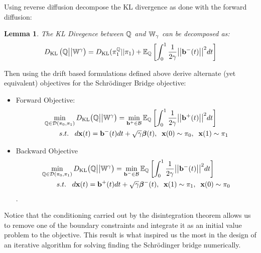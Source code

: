 \documentclass[a4paper,12pt,twoside,openright]{report}
\newtheorem{lemma}[theorem]{Lemma}
\theoremstyle{definition}
\begin{document}
Using reverse diffusion \cite{pavon1991free} decompose the KL divergence as done with the forward diffusion:
\begin{lemma}\label{lemma:control}\citep{pavon1991free}
    The KL Divegence between ${\mathbb{Q}}$ and $\mathbb{W}_{\gamma}$ can be decomposed as:
\begin{align}\label{eq:free_energy_2}
     D_{\mathrm{KL}}\left({\mathbb{Q}} \big|\big| \mathbb{W}^{\gamma}\right) = D_{\mathrm{KL}}(\pi^{{\mathbb{Q}}}_1 || \pi_1) + \mathbb{E}_{\mathbb{Q}}\left[\int_0^1\frac{1}{2\gamma} \big|\big|{\mathbf{b}}^{-}(t)\big|\big|^2 dt\right]
\end{align}
\end{lemma}
Then using the drift based formulations defined above \cite{pavon1991free} derive alternate (yet equivalent) objectives for the Schrödinger Bridge objective:

\begin{itemize}
\item Forward Objective: 
\begin{align} \label{eq:controlled_bridge_forward}
    \min_{{\mathbb{Q}} \in {\mathcal{D}}(\pi_0, \pi_1)} D_{\mathrm{KL}}\big({\mathbb{Q}} \big|\big| \mathbb{W}^{\gamma}\big)& = \min_{{\mathbf{b}}^{+} \in {\mathcal{B}} }  \mathbb{E}_{\mathbb{Q}}\left[\int_0^1 \frac{1}{2\gamma}\big|\big|{\mathbf{b}}^{+}(t) \big|\big|^2 dt\right] \nonumber \\
    s.t.\;\;\; d{\mathbf{x}}(t) = {\mathbf{b}}^{-}(t) &dt + \sqrt{\gamma} {\bm{\beta}}(t), \;\; {\mathbf{x}}(0) \sim \pi_0, \;\; {\mathbf{x}}(1) \sim \pi_1
\end{align}
\item Backward Objective
\begin{align} \label{eq:controlled_bridge_backward}
    \min_{{\mathbb{Q}} \in {\mathcal{D}}(\pi_0, \pi_1)} D_{\mathrm{KL}}\big({\mathbb{Q}} \big|\big| \mathbb{W}^{\gamma}\big)& = \min_{{\mathbf{b}}^{-} \in {\mathcal{B}} }  \mathbb{E}_{\mathbb{Q}}\left[\int_0^1 \frac{1}{2\gamma}\big|\big|{\mathbf{b}}^{-}(t) \big|\big|^2 dt\right] \nonumber \\
    s.t.\;\;\; d{\mathbf{x}}(t) = {\mathbf{b}}^{+}(t) &dt + \sqrt{\gamma} {\bm{\beta}}^{-}(t), \;\; {\mathbf{x}}(1) \sim \pi_1 , \;\; {\mathbf{x}}(0) \sim \pi_0
\end{align}.
\end{itemize}
Notice that the conditioning carried out by the disintegration theorem allows us to remove one of the boundary constraints and integrate it as an initial value problem to the objective. This result is what inspired us the most in the design of an iterative algorithm for solving finding the Schrödinger bridge numerically. 
\end{document}
